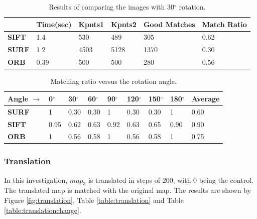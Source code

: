 \begin{table}[H]
\centering
\caption{Results of comparing the images with 30$^\circ$ rotation.}
\begin{tabular}{ | m{3em} | m{2cm} | m{1.5cm} | m{1.5cm} | m{1.5cm} | m{3cm} | } 
\hline
& \textbf{Time(sec)} & \textbf{Kpnts1}  & \textbf{Kpnts2} & \textbf{Good Matches} & \textbf{Match Ratio}\\ 
\hline
\textbf{SIFT}  & 1.4 & 530 & 489 & 305 & 0.62\\ 
\hline
\textbf{SURF}  & 1.2 & 4503 & 5128 & 1370 & 0.30\\ 
\hline
\textbf{ORB}  & 0.39 & 500 & 500 & 280 & 0.56\\ 
\hline 
\end{tabular}
\label{table:rotation}
\end{table}


\begin{table}[H]
\centering
\caption{Matching ratio versus the rotation angle.}
\begin{tabular}{ | m{5em} | m{1cm} | m{1cm} | m{1cm} | m{1cm} | m{1cm} | m{1cm} | m{1cm} || m{1.6cm} | } 
\hline
\textbf{Angle $\rightarrow$} & \textbf{0$^\circ$} & \textbf{30$^\circ$} & \textbf{60$^\circ$} & \textbf{90$^\circ$} & \textbf{120$^\circ$} & \textbf{150$^\circ$} & \textbf{180$^\circ$} & \textbf{Average}  \\ 
\hline
\textbf{SURF} & 1 & 0.30 & 0.30 & 1 & 0.30 & 0.30 & 1 & 0.60 \\
\hline
\textbf{SIFT} & 0.95 & 0.62 & 0.63 & 0.92 & 0.63 & 0.65 & 0.90 & 0.90\\ 
\hline
\textbf{ORB} & 1 & 0.56 & 0.58 & 1 & 0.56 & 0.58 & 1 & 0.75 \\ 
\hline
\hline
\end{tabular}
\label{table:rotationangle}
\end{table}

\subsubsection{Translation}
\label{sub:sec:translation}

In this investigation, $map_3$ is translated in steps of 200, with 0 being the control. The translated map is matched with the original map. The results are shown by Figure \ref{fig:translation}, Table \ref{table:translation} and Table \ref{table:translationchange}.

